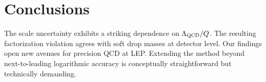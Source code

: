 \section{Conclusions}\label{sec:conclusions}

The scale uncertainty exhibits a striking dependence on $\Lambda_{\rm
QCD}/Q$. The resulting factorization violation agrees with soft drop
masses at detector level. Our findings open new avenues for precision
QCD at LEP. Extending the method beyond next-to-leading logarithmic
accuracy is conceptually straightforward but technically demanding.

